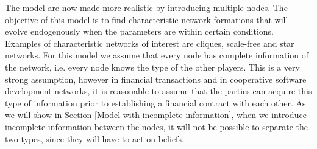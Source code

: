 The model are now made more realistic by introducing multiple nodes. The objective of this model is to find characteristic network formations that will evolve endogenously when the parameters are within certain conditions. 
Examples of characteristic networks of interest are cliques, scale-free and star networks.
For this model we assume that every node has complete information of the network, i.e. every node knows the type of the other players. This is a very strong assumption, however in financial transactions and in cooperative software development networks, it is reasonable to assume that the parties can acquire this type of information prior to establishing a financial contract with each other. As we will show in Section \ref{Model with incomplete information}, when we introduce incomplete information between the nodes, it will not be possible to separate the two types, since they will have to act on beliefs.
